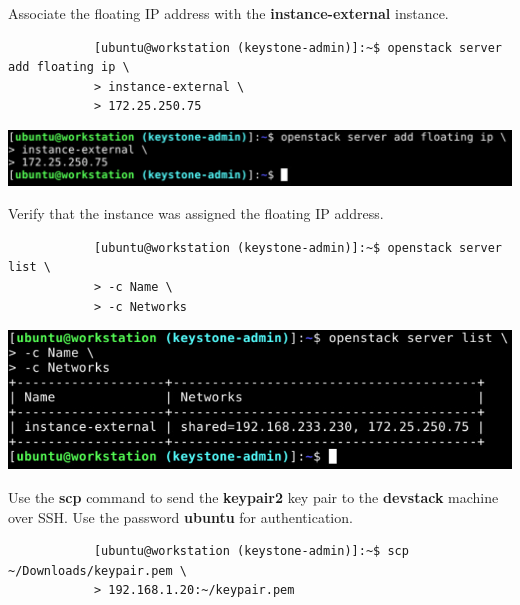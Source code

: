 \documentclass[letterpaper, 12pt]{article}
\begin{document}
\begin{enumerate}
    \begin{labstep}
        Associate the floating IP address with the \textbf{instance-external} instance.
        \begin{lstlisting}
            [ubuntu@workstation (keystone-admin)]:~$ openstack server add floating ip \
            > instance-external \
            > 172.25.250.75
        \end{lstlisting}

        \begin{center}
            \includegraphics[width=\linewidth]{images/part9/step36.png}
        \end{center}
    \end{labstep}

    \begin{labstep}
        Verify that the instance was assigned the floating IP address.
        \begin{lstlisting}
            [ubuntu@workstation (keystone-admin)]:~$ openstack server list \
            > -c Name \
            > -c Networks
        \end{lstlisting}

        \begin{center}
            \includegraphics[width=\linewidth]{images/part9/step37.png}
        \end{center}
    \end{labstep}

    \begin{labstep}
        Use the \textbf{scp} command to send the \textbf{keypair2} key pair to the \textbf{devstack} machine over SSH.
        Use the password \textbf{ubuntu} for authentication.
        \begin{lstlisting}
            [ubuntu@workstation (keystone-admin)]:~$ scp ~/Downloads/keypair.pem \
            > 192.168.1.20:~/keypair.pem
        \end{lstlisting}


\end{labstep}
\end{enumerate}
\end{document}
